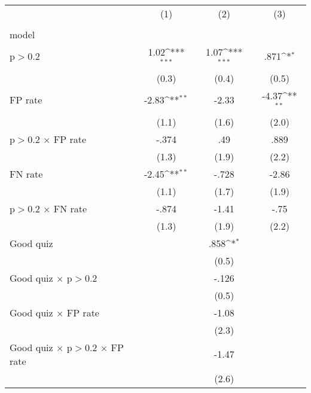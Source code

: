 {
\def\sym#1{\ifmmode^{#1}\else\(^{#1}\)\fi}
\begin{tabular}{l*{3}{c}}
\hline\hline
                &\multicolumn{1}{c}{(1)}&\multicolumn{1}{c}{(2)}&\multicolumn{1}{c}{(3)}\\
                &\multicolumn{1}{c}{}&\multicolumn{1}{c}{}&\multicolumn{1}{c}{}\\
\hline
model           &                  &                  &                  \\
p$>$0.2         &     1.02\sym{***}&     1.07\sym{***}&     .871\sym{*}  \\
                &    (0.3)         &    (0.4)         &    (0.5)         \\
FP rate         &    -2.83\sym{**} &    -2.33         &    -4.37\sym{**} \\
                &    (1.1)         &    (1.6)         &    (2.0)         \\
p$>$0.2 $\times$ FP rate&    -.374         &      .49         &     .889         \\
                &    (1.3)         &    (1.9)         &    (2.2)         \\
FN rate         &    -2.45\sym{**} &    -.728         &    -2.86         \\
                &    (1.1)         &    (1.7)         &    (1.9)         \\
p$>$0.2 $\times$ FN rate&    -.874         &    -1.41         &     -.75         \\
                &    (1.3)         &    (1.9)         &    (2.2)         \\
Good quiz       &                  &     .858\sym{*}  &                  \\
                &                  &    (0.5)         &                  \\
Good quiz $\times$ p$>$0.2&                  &    -.126         &                  \\
                &                  &    (0.5)         &                  \\
Good quiz $\times$ FP rate&                  &    -1.08         &                  \\
                &                  &    (2.3)         &                  \\
Good quiz $\times$ p$>$0.2 $\times$ FP rate&                  &    -1.47         &                  \\
                &                  &    (2.6)         &                  \\

\end{tabular}}
